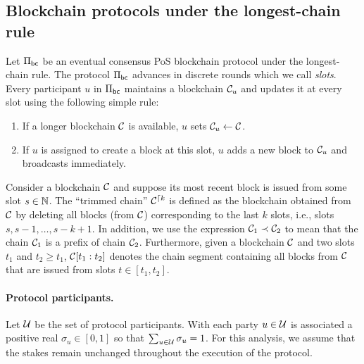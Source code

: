 
\newcommand{\Suffix}[2]{ \mathsf{suffix}({#1},{#2})}
\newcommand{\CoinTossingLC}{\Pi_\mathsf{lc}^{\Players(\alpha),k,n}}


\subsection{Blockchain protocols under the longest-chain rule}
Let $\Pi_\mathsf{bc}$ be an eventual consensus PoS blockchain protocol 
under the longest-chain rule. 
The protocol $\Pi_\mathsf{bc}$ advances in discrete rounds 
which we call \emph{slots}.
Every participant $u$ in $\Pi_\mathsf{bc}$ 
maintains a blockchain $\mathcal{C}_u$ 
and updates it at every slot using the following simple rule: 
\begin{enumerate}
  \item If a longer blockchain $\mathcal{C}$ is available, 
  $u$ sets $\mathcal{C}_u \leftarrow \mathcal{C}$.

  \item If $u$ is assigned to create a block at this slot, 
  $u$ adds a new block to $\mathcal{C}_u$ and broadcasts immediately.
\end{enumerate}

Consider a blockchain $\mathcal{C}$ and suppose its most recent block is issued from some slot $s \in \mathbb{N}$. 
The ``trimmed chain'' $\mathcal{C}^{\lceil {k}}$ is defined as 
the blockchain obtained from $\mathcal{C}$ by deleting all blocks (from $\mathcal{C}$) 
corresponding to the last $k$ slots, i.e., slots $s, s - 1, \ldots, s - k + 1$. 
In addition, we use the expression $\mathcal{C}_1 \prec \mathcal{C}_2$ to mean that 
the chain $\mathcal{C}_1$ is a prefix of chain $\mathcal{C}_2$. 
Furthermore, given a blockchain $\mathcal{C}$ and two slots $t_1$ and $t_2 \geq t_1$, 
$\mathcal{C}[t_1 : t_2]$ denotes the chain segment containing all blocks from $\mathcal{C}$ 
that are issued from slots $t \in [t_1, t_2]$.

\paragraph{Protocol participants.} 
Let $\mathcal{U}$ be the set of protocol participants. 
With each party $u \in \mathcal{U}$ is associated a positive real $\sigma_u \in [0, 1]$ 
so that $\sum_{u \in \mathcal{U}} \sigma_u = 1$. 
For this analysis, we assume that 
the stakes remain unchanged throughout the execution of the protocol.

